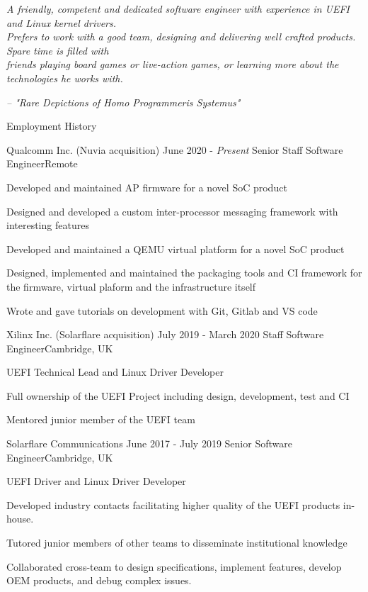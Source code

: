 \documentclass{format/resume} %
\begin{document}
{\it A friendly, competent and dedicated software engineer with experience in UEFI and Linux kernel drivers. \\
Prefers to work with a good team, designing and delivering well crafted products. Spare time is filled with \\
friends playing board games or live-action games, or learning more about the technologies he works with.}
\begin{flushright}
{\it -- "Rare Depictions of Homo Programmeris Systemus"}
\end{flushright}

\begin{rSection}{Employment History}
  \begin{rSubsection}{Qualcomm Inc. (Nuvia acquisition)}{ June 2020 - \it Present } {Senior Staff Software Engineer}{Remote}
    \item Developed and maintained AP firmware for a novel SoC product
    \item Designed and developed a custom inter-processor messaging framework with interesting features
    \item Developed and maintained a QEMU virtual platform for a novel SoC product
    \item Designed, implemented and maintained the packaging tools and CI framework for the firmware, virtual plaform and the infrastructure itself
    \item Wrote and gave tutorials on development with Git, Gitlab and VS code
  \end{rSubsection}
  
  \begin{rSubsection}{Xilinx Inc. (Solarflare acquisition)}{ July 2019 - March 2020 } {Staff Software Engineer}{Cambridge, UK}
    \item UEFI Technical Lead and Linux Driver Developer
    \item Full ownership of the UEFI Project including design, development, test and CI
    \item Mentored junior member of the UEFI team
  \end{rSubsection}

  \begin{rSubsection}{Solarflare Communications}{ June 2017 - July 2019 } {Senior Software Engineer}{Cambridge, UK}
    \item UEFI Driver and Linux Driver Developer
    \item Developed industry contacts facilitating higher quality of the UEFI products in-house.
    \item Tutored junior members of other teams to disseminate institutional knowledge
    \item Collaborated cross-team to design specifications, implement features, develop OEM products, and debug complex issues.
  \end{rSubsection}


\end{rSection}
\end{document}
